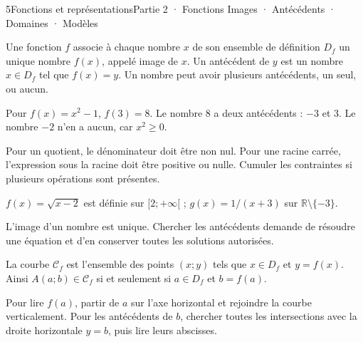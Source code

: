 \begin{ouverture}[courbe]{5}{Fonctions et représentations}{Partie 2 · Fonctions}
{Images · Antécédents · Domaines · Modèles}
\end{ouverture}
\pagestyle{otMain}\essentiel\fontsize{11}{15}\selectfont
{}
\begin{definition}Une fonction $f$ associe à chaque nombre $x$ de son ensemble de définition $D_f$ un unique nombre $f(x)$, appelé image de $x$. Un antécédent de $y$ est un nombre $x\in D_f$ tel que $f(x)=y$. Un nombre peut avoir plusieurs antécédents, un seul, ou aucun.\end{definition}
\begin{exemple}Pour $f(x)=x^2-1$, $f(3)=8$. Le nombre 8 a deux antécédents : $-3$ et 3. Le nombre $-2$ n’en a aucun, car $x^2\ge0$.\end{exemple}
\begin{savoirfaire}
Pour un quotient, le dénominateur doit être non nul. Pour une racine carrée, l’expression sous la racine doit être positive ou nulle. Cumuler les contraintes si plusieurs opérations sont présentes.
\end{savoirfaire}
\begin{exemple}$f(x)=\sqrt{x-2}$ est définie sur $[2;+\infty[$ ; $g(x)=1/(x+3)$ sur $\mathbb R\setminus\{-3\}$.\end{exemple}
\begin{attention}L’image d’un nombre est unique. Chercher les antécédents demande de résoudre une équation et d’en conserver toutes les solutions autorisées.\end{attention}
\clearpage
{}
\begin{definition}La courbe $\mathcal C_f$ est l’ensemble des points $(x;y)$ tels que $x\in D_f$ et $y=f(x)$. Ainsi $A(a;b)\in\mathcal C_f$ si et seulement si $a\in D_f$ et $b=f(a)$.\end{definition}
\begin{savoirfaire}
Pour lire $f(a)$, partir de $a$ sur l’axe horizontal et rejoindre la courbe verticalement. Pour les antécédents de $b$, chercher toutes les intersections avec la droite horizontale $y=b$, puis lire leurs abscisses.
\end{savoirfaire}
